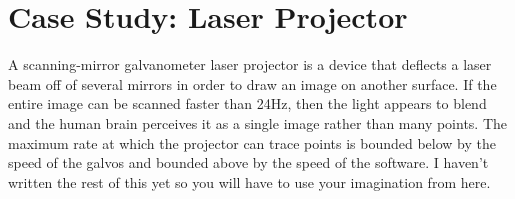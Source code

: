 \section{Case Study: Laser Projector}\label{sec:laser}
A scanning-mirror galvanometer laser projector is a device that deflects a laser beam off of several mirrors in
order to draw an image on another surface. If the entire image can be scanned faster than 24Hz, then the light appears
to blend and the human brain perceives it as a single image rather than many points. The maximum rate at which the
projector can trace points is bounded below by the speed of the galvos and bounded above by the speed of the software.
I haven't written the rest of this yet so you will have to use your imagination from here.
